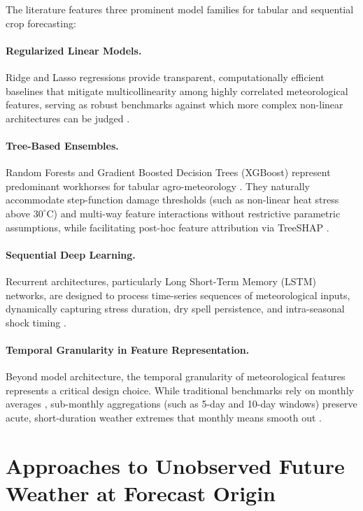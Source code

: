 The literature features three prominent model families for tabular and sequential crop forecasting:

\paragraph{Regularized Linear Models.} Ridge and Lasso regressions provide transparent, computationally efficient baselines that mitigate multicollinearity among highly correlated meteorological features, serving as robust benchmarks against which more complex non-linear architectures can be judged \citep{James2023}.

\paragraph{Tree-Based Ensembles.} Random Forests and Gradient Boosted Decision Trees (XGBoost) represent predominant workhorses for tabular agro-meteorology \citep{Sharmaetal2025}. They naturally accommodate step-function damage thresholds (such as non-linear heat stress above $30^\circ\text{C}$) and multi-way feature interactions without restrictive parametric assumptions, while facilitating post-hoc feature attribution via TreeSHAP \citep{ChenZhang2026}.

\paragraph{Sequential Deep Learning.} Recurrent architectures, particularly Long Short-Term Memory (LSTM) networks, are designed to process time-series sequences of meteorological inputs, dynamically capturing stress duration, dry spell persistence, and intra-seasonal shock timing \citep{Khaki2020}.

\paragraph{Temporal Granularity in Feature Representation.} Beyond model architecture, the temporal granularity of meteorological features represents a critical design choice. While traditional benchmarks rely on monthly averages \citep{ChenZhang2026}, sub-monthly aggregations (such as 5-day and 10-day windows) preserve acute, short-duration weather extremes that monthly means smooth out \citep{Yinetal2026}.

\section{Approaches to Unobserved Future Weather at Forecast Origin}
\label{sec:lit_future_weather}

